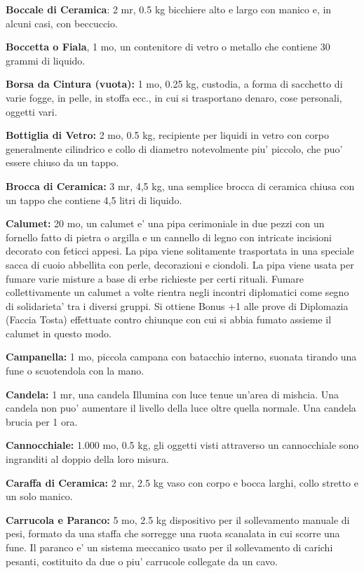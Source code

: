 \documentclass[a4paper,11pt,twoside,openany]{dndbook}
\begin{document}
{\textbf{Boccale di Ceramica}: 2 mr, 0.5 kg bicchiere alto e largo con manico e, in alcuni casi, con beccuccio.

\textbf{Boccetta o Fiala}, 1 mo, un contenitore di vetro o metallo che contiene 30 grammi di liquido.

\textbf{Borsa da Cintura (vuota):} 1 mo, 0.25 kg, custodia, a forma di sacchetto di varie fogge, in pelle, in stoffa ecc., in cui si trasportano denaro, cose personali, oggetti vari.

\textbf{Bottiglia di Vetro:} 2 mo, 0.5 kg, recipiente per liquidi in vetro con corpo generalmente cilindrico e collo di diametro notevolmente piu' piccolo, che puo' essere chiuso da un tappo.

\textbf{Brocca di Ceramica:} 3 mr, 4,5 kg, una semplice brocca di ceramica chiusa con un tappo che contiene 4,5 litri di liquido.

\textbf{Calumet:} 20 mo, un calumet e' una pipa cerimoniale in due pezzi con un fornello fatto di pietra o argilla e un cannello di legno con intricate incisioni decorato con feticci appesi. La pipa viene solitamente trasportata in una speciale sacca di cuoio abbellita con perle, decorazioni e ciondoli. La pipa viene usata per fumare varie misture a base di erbe richieste per certi rituali. Fumare collettivamente un calumet a volte rientra negli incontri diplomatici come segno di solidarieta' tra i diversi gruppi. Si ottiene Bonus +1 alle prove di Diplomazia (Faccia Tosta) effettuate contro chiunque con cui si abbia fumato assieme il calumet in questo modo.

\textbf{Campanella:} 1 mo, piccola campana con batacchio interno, suonata tirando una fune o scuotendola con la mano.

\textbf{Candela:} 1 mr, una candela Illumina con luce tenue un'area di mishcia. Una candela non puo' aumentare il livello della luce oltre quella normale. Una candela brucia per 1 ora.

\textbf{Cannocchiale:} 1.000 mo, 0.5 kg, gli oggetti visti attraverso un cannocchiale sono ingranditi al doppio della loro misura.

\textbf{Caraffa di Ceramica:} 2 mr, 2.5 kg vaso con corpo e bocca larghi, collo stretto e un solo manico.

\textbf{Carrucola e Paranco:} 5 mo, 2.5 kg dispositivo per il sollevamento manuale di pesi, formato da una staffa che sorregge una ruota scanalata in cui scorre una fune. Il paranco e' un sistema meccanico usato per il sollevamento di carichi pesanti, costituito da due o piu' carrucole collegate da un cavo.

}
\end{document}
